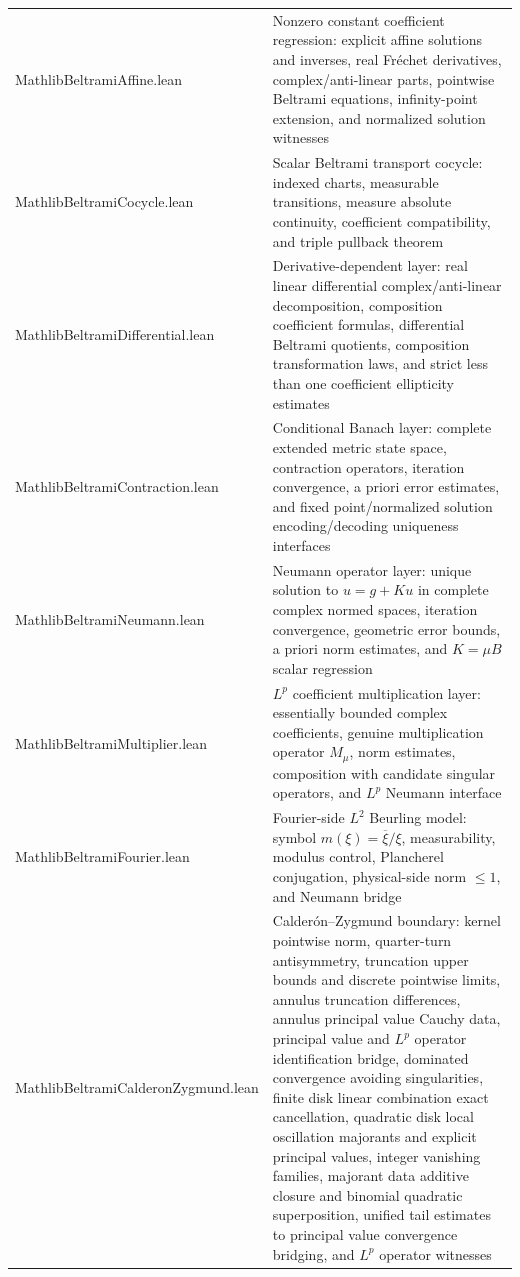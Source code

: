 \documentclass[UTF8,a4paper,11pt]{article}
\begin{document}
\begin{center}
\begin{tabularx}{\textwidth}{>{\ttfamily}lX}
MathlibBeltramiAffine.lean & Nonzero constant coefficient regression: explicit affine solutions and inverses, real Fréchet derivatives, complex/anti-linear parts, pointwise Beltrami equations, infinity-point extension, and normalized solution witnesses \\
MathlibBeltramiCocycle.lean & Scalar Beltrami transport cocycle: indexed charts, measurable transitions, measure absolute continuity, coefficient compatibility, and triple pullback theorem \\
MathlibBeltramiDifferential.lean & Derivative-dependent layer: real linear differential complex/anti-linear decomposition, composition coefficient formulas, differential Beltrami quotients, composition transformation laws, and strict less than one coefficient ellipticity estimates \\
MathlibBeltramiContraction.lean & Conditional Banach layer: complete extended metric state space, contraction operators, iteration convergence, a priori error estimates, and fixed point/normalized solution encoding/decoding uniqueness interfaces \\
MathlibBeltramiNeumann.lean & Neumann operator layer: unique solution to \(u=g+Ku\) in complete complex normed spaces, iteration convergence, geometric error bounds, a priori norm estimates, and \(K=\mu B\) scalar regression \\
MathlibBeltramiMultiplier.lean & \(L^p\) coefficient multiplication layer: essentially bounded complex coefficients, genuine multiplication operator \(M_\mu\), norm estimates, composition with candidate singular operators, and \(L^p\) Neumann interface \\
MathlibBeltramiFourier.lean & Fourier-side \(L^2\) Beurling model: symbol \(m(\xi)=\overline{\xi}/\xi\), measurability, modulus control, Plancherel conjugation, physical-side norm \(\leq 1\), and Neumann bridge \\
MathlibBeltramiCalderonZygmund.lean & Calderón--Zygmund boundary: kernel pointwise norm, quarter-turn antisymmetry, truncation upper bounds and discrete pointwise limits, annulus truncation differences, annulus principal value Cauchy data, principal value and \(L^p\) operator identification bridge, dominated convergence avoiding singularities, finite disk linear combination exact cancellation, quadratic disk local oscillation majorants and explicit principal values, integer vanishing families, majorant data additive closure and binomial quadratic superposition, unified tail estimates to principal value convergence bridging, and \(L^p\) operator witnesses \\

\end{tabularx}
\end{center}
\end{document}

